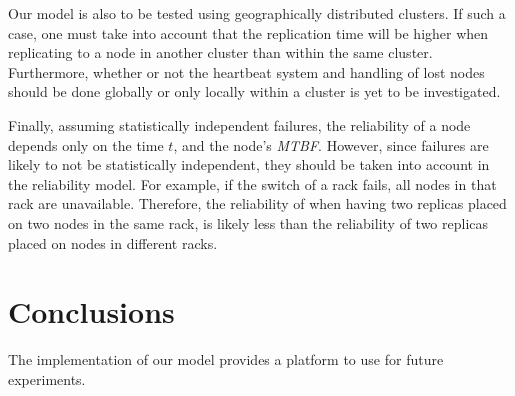 \documentclass{cslthse-msc}
\begin{document}
Our model is also to be tested using geographically distributed clusters. If such a case, one must take into account that the replication time will be higher when replicating to a node in another cluster than within the same cluster. Furthermore, whether or not the heartbeat system and handling of lost nodes should be done globally or only locally within a cluster is yet to be investigated.

Finally, assuming statistically independent failures, the reliability of a node depends only on the time $t$, and the node's \emph{MTBF}. However, since failures are likely to not be statistically independent, they should be taken into account in the reliability model. For example, if the switch of a rack fails, all nodes in that rack are unavailable. Therefore, the reliability of when having two replicas placed on two nodes in the same rack, is likely less than the reliability of two replicas placed on nodes in different racks.


\chapter{Conclusions} \label{ch:conclusions}
The implementation of our model provides a platform to use for future experiments.
\end{document}
